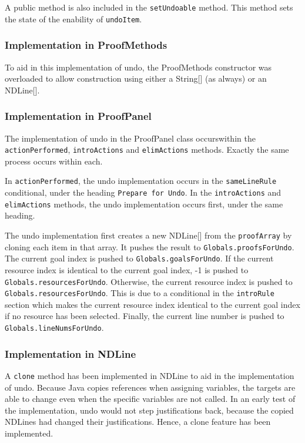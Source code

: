 \documentclass[a4paper]{article}
\begin{document}
A public method is also included in the \texttt{setUndoable} method. This method sets the state of the enability of \texttt{undoItem}.

\subsubsection{Implementation in ProofMethods}
To aid in this implementation of undo, the ProofMethods constructor was overloaded to allow construction using either a String[] (as always) or an NDLine[].

\subsubsection{Implementation in ProofPanel}
The implementation of undo in the ProofPanel class occurswithin the \texttt{actionPerformed}, \texttt{introActions} and \texttt{elimActions} methods. Exactly the same process occurs within each.

In \texttt{actionPerformed}, the undo implementation occurs in the \texttt{sameLineRule} conditional, under the heading \texttt{Prepare for Undo}. In the \texttt{introActions} and \texttt{elimActions} methods, the undo implementation occurs first, under the same heading.

The undo implementation first creates a new NDLine[] from the \texttt{proofArray} by cloning each item in that array. It pushes the result to \texttt{Globals.proofsForUndo}. The current goal index is pushed to \texttt{Globals.goalsForUndo}. If the current resource index is identical to the current goal index, -1 is pushed to \texttt{Globals.resourcesForUndo}. Otherwise, the current resource index is pushed to \texttt{Globals.resourcesForUndo}. This is due to a conditional in the \texttt{introRule} section which makes the current resource index identical to the current goal index if no resource has been selected. Finally, the current line number is pushed to \texttt{Globals.lineNumsForUndo}.

\subsubsection{Implementation in NDLine}
A \texttt{clone} method has been implemented in NDLine to aid in the implementation of undo. Because Java copies references when assigning variables, the targets are able to change even when the specific variables are not called. In an early test of the implementation, undo would not step justifications back, because the copied NDLines had changed their justifications. Hence, a clone feature has been implemented.
\end{document}
